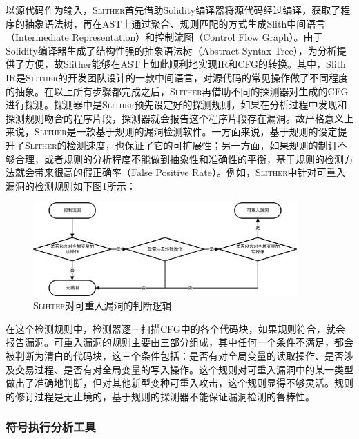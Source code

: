 以源代码作为输入，\textsc{Slither}首先借助Solidity编译器将源代码经过编译，获取了程序的抽象语法树，再在AST上通过聚合、规则匹配的方式生成Slith中间语言（Intermediate Representation）和控制流图（Control Flow Graph）。由于Solidity编译器生成了结构性强的抽象语法树（Abstract Syntax Tree），为分析提供了方便，故Slither能够在AST上如此顺利地实现IR和CFG的转换。其中，Slith IR是\textsc{Slither}的开发团队设计的一款中间语言，对源代码的常见操作做了不同程度的抽象。在以上所有步骤都完成之后，\textsc{Slither}再借助不同的探测器对生成的CFG进行探测。探测器中是\textsc{Slither}预先设定好的探测规则，如果在分析过程中发现和探测规则吻合的程序片段，探测器就会报告这个程序片段存在漏洞。故严格意义上来说，\textsc{Slither}是一款基于规则的漏洞检测软件。一方面来说，基于规则的设定提升了\textsc{Slither}的检测速度，也保证了它的可扩展性；另一方面，如果规则的制订不够合理，或者规则的分析程度不能做到抽象性和准确性的平衡，基于规则的检测方法就会带来很高的假正确率（False Positive Rate）。例如，\textsc{Slither}中针对可重入漏洞的检测规则如下图\ref{fig:slither_reentrancy_flow}所示：

\begin{figure}
\vspace{+2mm}
  \centering
  \includegraphics[width=0.9\textwidth]{figures/slither_reentrancy_flow.png}
  \caption{\textsc{Slihter}对可重入漏洞的判断逻辑}
  \label{fig:slither_reentrancy_flow}
\vspace{-5mm}
\end{figure}

在这个检测规则中，检测器逐一扫描CFG中的各个代码块，如果规则符合，就会报告漏洞。可重入漏洞的规则主要由三部分组成，其中任何一个条件不满足，都会被判断为清白的代码块，这三个条件包括：是否有对全局变量的读取操作、是否涉及交易过程、是否有对全局变量的写入操作。这个规则对可重入漏洞中的某一类型做出了准确地判断，但对其他新型变种可重入攻击，这个规则显得不够灵活。规则的修订过程是无止境的，基于规则的探测器不能保证漏洞检测的鲁棒性。


\subsubsection{符号执行分析工具}

